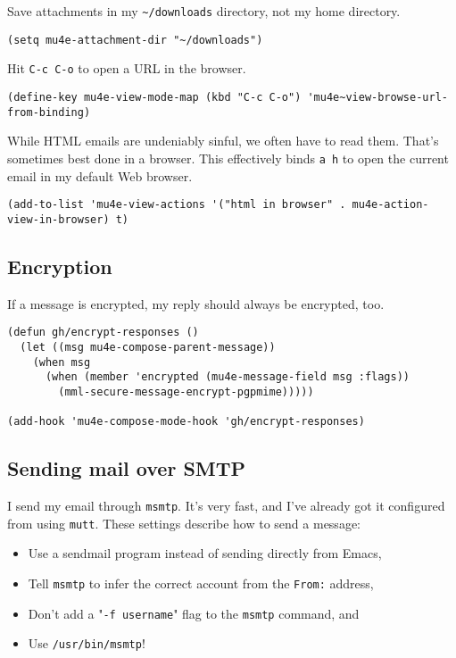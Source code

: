 \documentclass[11pt]{article}
\begin{document}
Save attachments in my \texttt{\textasciitilde{}/downloads} directory, not my home directory.

\begin{verbatim}
(setq mu4e-attachment-dir "~/downloads")
\end{verbatim}

Hit \texttt{C-c C-o} to open a URL in the browser.

\begin{verbatim}
(define-key mu4e-view-mode-map (kbd "C-c C-o") 'mu4e~view-browse-url-from-binding)
\end{verbatim}

While HTML emails are undeniably sinful, we often have to read them. That's
sometimes best done in a browser. This effectively binds \texttt{a h} to open the
current email in my default Web browser.

\begin{verbatim}
(add-to-list 'mu4e-view-actions '("html in browser" . mu4e-action-view-in-browser) t)
\end{verbatim}

\subsection{Encryption}
\label{sec:org39dd0a2}

If a message is encrypted, my reply should always be encrypted, too.

\begin{verbatim}
(defun gh/encrypt-responses ()
  (let ((msg mu4e-compose-parent-message))
    (when msg
      (when (member 'encrypted (mu4e-message-field msg :flags))
        (mml-secure-message-encrypt-pgpmime)))))

(add-hook 'mu4e-compose-mode-hook 'gh/encrypt-responses)
\end{verbatim}

\subsection{Sending mail over SMTP}
\label{sec:org3b482ad}

I send my email through \texttt{msmtp}. It's very fast, and I've already got it
configured from using \texttt{mutt}. These settings describe how to send a message:

\begin{itemize}
\item Use a sendmail program instead of sending directly from Emacs,
\item Tell \texttt{msmtp} to infer the correct account from the \texttt{From:} address,
\item Don't add a "\texttt{-f username}" flag to the \texttt{msmtp} command, and
\item Use \texttt{/usr/bin/msmtp}!
\end{itemize}
\end{document}
